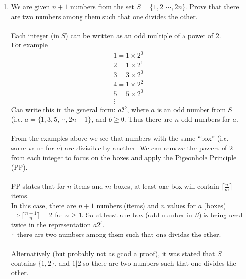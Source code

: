 \documentclass[10pt,a4paper,final]{article}
\begin{document}
\begin{enumerate}
\item %
We are given $n+1$ numbers from the set $S = \{1, 2, \cdots, 2n\}$.
Prove that there are two numbers among them such that one divides the other. \\
\\
Each integer (in $S$) can be written as an odd multiple of a power of 2.\\
For example
\begin{eqnarray*}
1 = 1 \times 2^0 \\
2 = 1 \times 2^1 \\
3 = 3 \times 2^0 \\
4 = 1 \times 2^2 \\
5 = 5 \times 2^0 \\
\vdots
\end{eqnarray*}
Can write this in the general form: $a2^b$, where $a$ is an odd number from $S$
(i.e. $a = \{1,3,5,\cdots,2n-1\}$, and $b \geq 0$. Thus there are $n$ odd numbers for $a$.\\
\\
From the examples above we see that numbers with the same ``box'' (i.e. same value for $a$)
are divisible by another. We can remove the powers of 2 from each integer to focus on the boxes
and apply the Pigeonhole Principle (PP).\\
\\
PP states that for $n$ items and $m$ boxes, at least one box will contain $\lceil \frac{n}{m} \rceil$
items.\\
In this case, there are $n+1$ numbers (items) and $n$ values for $a$ (boxes)
$\Rightarrow \lceil \frac{n+1}{n} \rceil = 2$ for $n \geq 1$.
So at least one box (odd number in $S$) is being used twice in the representation $a2^b$.\\
$\therefore$ there are two numbers among them such that one divides the other.\\
\\
Alternatively (but probably not as good a proof), it was stated that $S$ contains $\{1,2\}$, and $1|2$ 
so there are two numbers such that one divides the other.
\end{enumerate}
\end{document}
